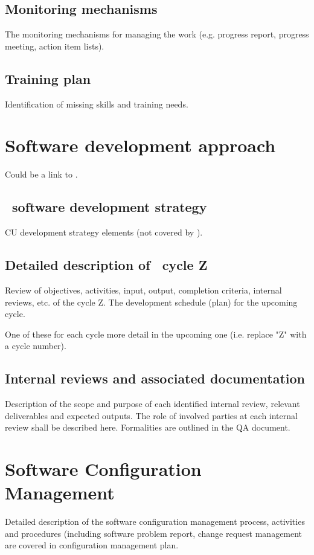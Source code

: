 \documentclass[DM,lsstdraft,SDP]{lsstdoc}
\begin{document}
\subsection{Monitoring mechanisms  \label{sect:monitoring}}
The monitoring mechanisms for managing the work (e.g. progress report,
progress meeting, action item lists).

\subsection{Training plan  \label{sect:Training Plan}}
Identification of missing skills and training needs.

\section{Software development  approach \label{sect:approach}}
Could be a link to .

\subsection{\CU ~software development strategy \label{sect:strategy}}
CU development strategy elements (not covered by ).

\subsection{Detailed description of \CU ~cycle Z \label{sect:detailcyclez}}
Review of objectives, activities, input, output, completion criteria, internal reviews, etc. of the cycle Z. The development schedule (plan) for the upcoming cycle.

One of these for each cycle more detail in the upcoming one (i.e. replace "Z" with a cycle number).

\subsection{Internal reviews and associated documentation
\label{sect:internalreview}}
Description of the scope and purpose of each identified internal review, relevant deliverables and expected
outputs. The role of involved parties at each internal review shall be
described here. Formalities are outlined in the QA document.

\section{Software Configuration Management \label{sect:configmngt}}
Detailed description of the software configuration management process, activities and procedures (including
software problem report, change request management are covered in
 configuration management plan.
\end{document}
